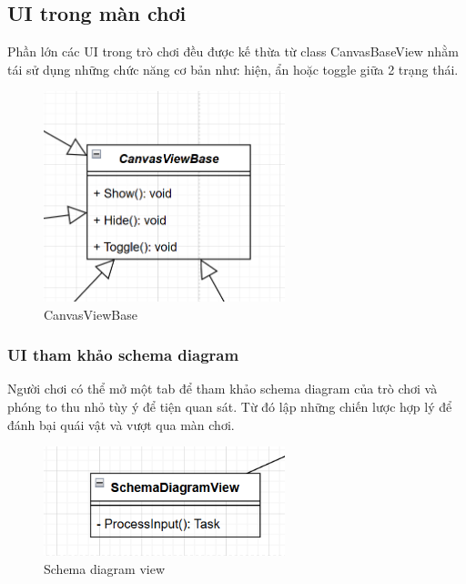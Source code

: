 \subsection{UI trong màn chơi}
Phần lớn các UI trong trò chơi đều được kế thừa từ class CanvasBaseView nhằm tái sử dụng những chức năng cơ bản như: hiện, ẩn hoặc toggle giữa 2 trạng thái.
\begin{figure}[H]
	\centering
	\includegraphics[width=7cm]{Images/CanvasViewBase.png}
	\vspace{0.5cm}
	\caption{CanvasViewBase}
\end{figure}

\subsubsection{UI tham khảo schema diagram}

Người chơi có thể mở một tab để tham khảo schema diagram của trò chơi và phóng to thu nhỏ tùy ý để tiện quan sát. Từ đó lập những chiến lược hợp lý để đánh bại quái vật và vượt qua màn chơi.

\begin{figure}[H]
	\centering
	\includegraphics[width=7cm]{Images/SchemaDiagramView.png}
	\vspace{0.5cm}
	\caption{Schema diagram view}
\end{figure}

